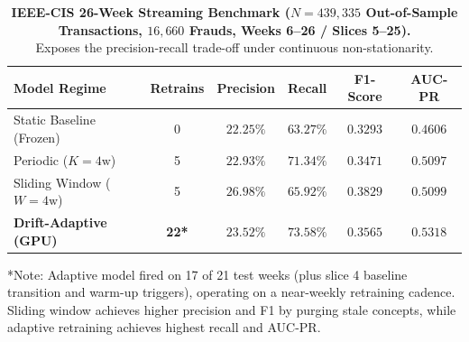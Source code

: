 \begin{table}[t]
\centering
\caption{\textbf{IEEE-CIS 26-Week Streaming Benchmark ($N=439{,}335$ Out-of-Sample Transactions, $16,660$ Frauds, Weeks 6--26 / Slices 5--25).}\\Exposes the precision-recall trade-off under continuous non-stationarity.}
\label{tab:ieeecis_streaming}
\small
\begin{tabularx}{0.48\textwidth}{l c c c c c}
\toprule
\textbf{Model Regime} & \textbf{Retrains} & \textbf{Precision} & \textbf{Recall} & \textbf{F1-Score} & \textbf{AUC-PR} \\
\midrule
Static Baseline (Frozen) & 0 & $22.25\%$ & $63.27\%$ & $0.3293$ & $0.4606$ \\
Periodic ($K=4\text{w}$) & 5 & $22.93\%$ & $71.34\%$ & $0.3471$ & $0.5097$ \\
Sliding Window ($W=4\text{w}$) & 5 & $\mathbf{26.98\%}$ & $65.92\%$ & $\mathbf{0.3829}$ & $0.5099$ \\
\textbf{Drift-Adaptive (GPU)} & \textbf{22*} & $23.52\%$ & $\mathbf{73.58\%}$ & $0.3565$ & $\mathbf{0.5318}$ \\
\bottomrule
\end{tabularx}
\vspace{1mm}
\footnotesize{*Note: Adaptive model fired on 17 of 21 test weeks (plus slice 4 baseline transition and warm-up triggers), operating on a near-weekly retraining cadence. Sliding window achieves higher precision and F1 by purging stale concepts, while adaptive retraining achieves highest recall and AUC-PR.}
\end{table}
